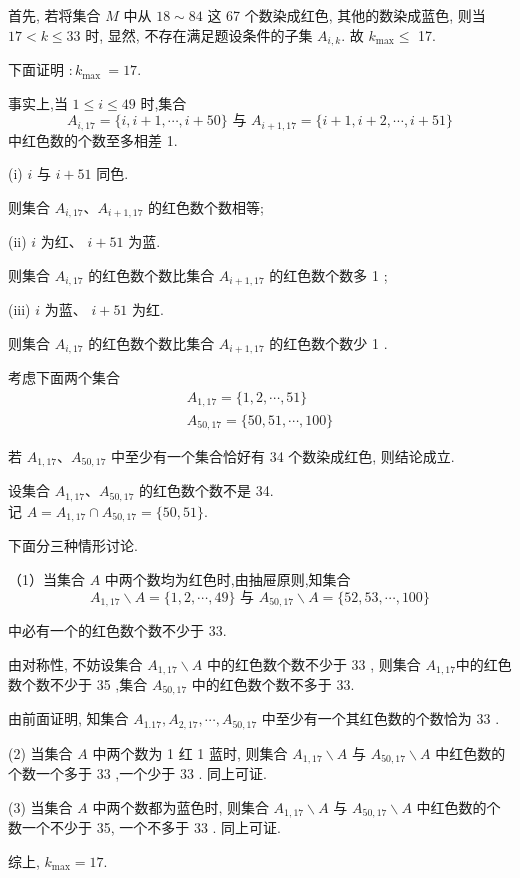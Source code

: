 \begin{solution}
	首先, 若将集合 $M$ 中从 $18 \sim 84$ 这 67 个数染成红色, 其他的数染成蓝色, 则当 $17<k \leqslant 33$ 时, 显然, 不存在满足题设条件的子集 $A_{i, k}$. 故 $k_{\max } \leqslant$ 17.

	下面证明 $: k_{\text {max }}=17$.

	事实上,当 $1 \leqslant i \leqslant 49$ 时,集合
	$$
		A_{i, 17}=\{i, i+1, \cdots, i+50\} \text { 与 } A_{i+1,17}=\{i+1, i+2, \cdots, i+51\}
	$$
	中红色数的个数至多相差 1.

	(i) $i$ 与 $i+51$ 同色.

	则集合 $A_{i, 17} 、 A_{i+1,17}$ 的红色数个数相等;

	(ii) $i$ 为红、 $i+51$ 为蓝.

	则集合 $A_{i, 17}$ 的红色数个数比集合 $A_{i+1,17}$ 的红色数个数多 1 ;

	(iii) $i$ 为蓝、 $i+51$ 为红.

	则集合 $A_{i, 17}$ 的红色数个数比集合 $A_{i+1,17}$ 的红色数个数少 1 .

	考虑下面两个集合
	$$
		\begin{gathered}
			A_{1,17}=\{1,2, \cdots, 51\} \\
			A_{50,17}=\{50,51, \cdots, 100\}
		\end{gathered}
	$$

	若 $A_{1,17} 、 A_{50,17}$ 中至少有一个集合恰好有 34 个数染成红色, 则结论成立.

	设集合 $A_{1,17} 、 A_{50,17}$ 的红色数个数不是 34.\\
	记 $A=A_{1,17} \cap A_{50,17}=\{50,51\}$.

	下面分三种情形讨论.

	（1）当集合 $A$ 中两个数均为红色时,由抽屉原则,知集合
	$$
		A_{1,17} \backslash A=\{1,2, \cdots, 49\} \text { 与 } A_{50,17} \backslash A=\{52,53, \cdots, 100\}
	$$

	中必有一个的红色数个数不少于 33.

	由对称性, 不妨设集合 $A_{1,17} \backslash A$ 中的红色数个数不少于 33 , 则集合 $A_{1,17}$中的红色数个数不少于 35 ,集合 $A_{50,17}$ 中的红色数个数不多于 33.

	由前面证明, 知集合 $A_{1.17}, A_{2,17}, \cdots, A_{50,17}$ 中至少有一个其红色数的个数恰为 33 .

	(2) 当集合 $A$ 中两个数为 1 红 1 蓝时, 则集合 $A_{1,17} \backslash A$ 与 $A_{50,17} \backslash A$ 中红色数的个数一个多于 33 ,一个少于 33 . 同上可证.

	(3) 当集合 $A$ 中两个数都为蓝色时, 则集合 $A_{1,17} \backslash A$ 与 $A_{50,17} \backslash A$ 中红色数的个数一个不少于 35, 一个不多于 33 . 同上可证.

	综上, $k_{\max }=17$.
\end{solution}

